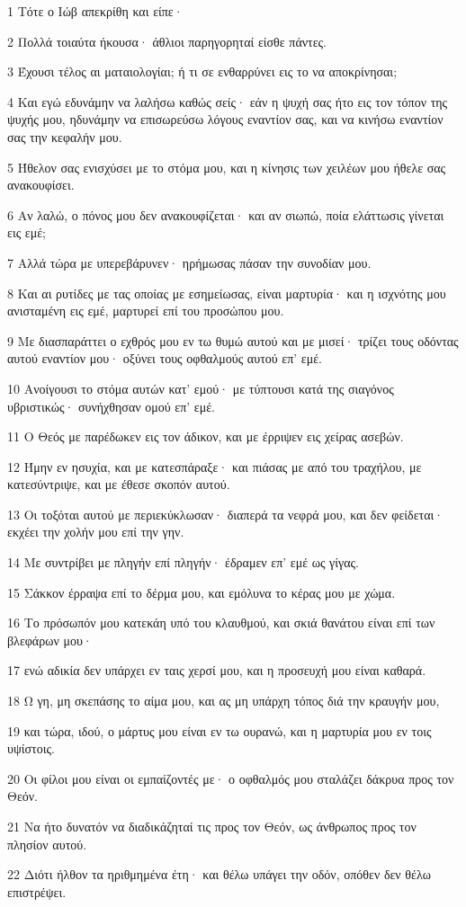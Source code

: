 \par 1 Τότε ο Ιώβ απεκρίθη και είπε·
\par 2 Πολλά τοιαύτα ήκουσα· άθλιοι παρηγορηταί είσθε πάντες.
\par 3 Έχουσι τέλος αι ματαιολογίαι; ή τι σε ενθαρρύνει εις το να αποκρίνησαι;
\par 4 Και εγώ εδυνάμην να λαλήσω καθώς σείς· εάν η ψυχή σας ήτο εις τον τόπον της ψυχής μου, ηδυνάμην να επισωρεύσω λόγους εναντίον σας, και να κινήσω εναντίον σας την κεφαλήν μου.
\par 5 Ήθελον σας ενισχύσει με το στόμα μου, και η κίνησις των χειλέων μου ήθελε σας ανακουφίσει.
\par 6 Αν λαλώ, ο πόνος μου δεν ανακουφίζεται· και αν σιωπώ, ποία ελάττωσις γίνεται εις εμέ;
\par 7 Αλλά τώρα με υπερεβάρυνεν· ηρήμωσας πάσαν την συνοδίαν μου.
\par 8 Και αι ρυτίδες με τας οποίας με εσημείωσας, είναι μαρτυρία· και η ισχνότης μου ανισταμένη εις εμέ, μαρτυρεί επί του προσώπου μου.
\par 9 Με διασπαράττει ο εχθρός μου εν τω θυμώ αυτού και με μισεί· τρίζει τους οδόντας αυτού εναντίον μου· οξύνει τους οφθαλμούς αυτού επ' εμέ.
\par 10 Ανοίγουσι το στόμα αυτών κατ' εμού· με τύπτουσι κατά της σιαγόνος υβριστικώς· συνήχθησαν ομού επ' εμέ.
\par 11 Ο Θεός με παρέδωκεν εις τον άδικον, και με έρριψεν εις χείρας ασεβών.
\par 12 Ήμην εν ησυχία, και με κατεσπάραξε· και πιάσας με από του τραχήλου, με κατεσύντριψε, και με έθεσε σκοπόν αυτού.
\par 13 Οι τοξόται αυτού με περιεκύκλωσαν· διαπερά τα νεφρά μου, και δεν φείδεται· εκχέει την χολήν μου επί την γην.
\par 14 Με συντρίβει με πληγήν επί πληγήν· έδραμεν επ' εμέ ως γίγας.
\par 15 Σάκκον έρραψα επί το δέρμα μου, και εμόλυνα το κέρας μου με χώμα.
\par 16 Το πρόσωπόν μου κατεκάη υπό του κλαυθμού, και σκιά θανάτου είναι επί των βλεφάρων μου·
\par 17 ενώ αδικία δεν υπάρχει εν ταις χερσί μου, και η προσευχή μου είναι καθαρά.
\par 18 Ω γη, μη σκεπάσης το αίμα μου, και ας μη υπάρχη τόπος διά την κραυγήν μου,
\par 19 και τώρα, ιδού, ο μάρτυς μου είναι εν τω ουρανώ, και η μαρτυρία μου εν τοις υψίστοις.
\par 20 Οι φίλοι μου είναι οι εμπαίζοντές με· ο οφθαλμός μου σταλάζει δάκρυα προς τον Θεόν.
\par 21 Να ήτο δυνατόν να διαδικάζηταί τις προς τον Θεόν, ως άνθρωπος προς τον πλησίον αυτού.
\par 22 Διότι ήλθον τα ηριθμημένα έτη· και θέλω υπάγει την οδόν, οπόθεν δεν θέλω επιστρέψει.

